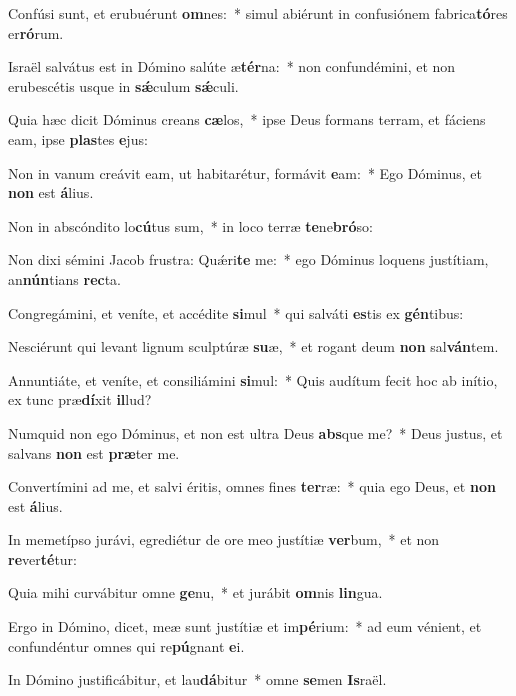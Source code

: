 \item Confúsi sunt, et erubuérunt \textbf{om}nes:~* simul abiérunt in confusiónem fabrica\textbf{tó}res er\textbf{ró}rum.
\item Israël salvátus est in Dómino salúte æ\textbf{tér}na:~* non confundémini, et non erubescétis usque in \textbf{sǽ}culum \textbf{sǽ}culi.
\item Quia hæc dicit Dóminus creans \textbf{cæ}los,~* ipse Deus formans terram, et fáciens eam, ipse \textbf{plas}tes \textbf{e}jus:
\item Non in vanum creávit eam, ut habitarétur, formávit \textbf{e}am:~* Ego Dóminus, et \textbf{non} est \textbf{á}lius.
\item Non in abscóndito lo\textbf{cú}tus sum,~* in loco terræ \textbf{te}ne\textbf{bró}so:
\item Non dixi sémini Jacob frustra: Quǽri\textbf{te} me:~* ego Dóminus loquens justítiam, an\textbf{nún}tians \textbf{rec}ta.
\item Congregámini, et veníte, et accédite \textbf{si}mul~* qui salváti \textbf{es}tis ex \textbf{gén}tibus:
\item Nesciérunt qui levant lignum sculptúræ \textbf{su}æ,~* et rogant deum \textbf{non} sal\textbf{ván}tem.
\item Annuntiáte, et veníte, et consiliámini \textbf{si}mul:~* Quis audítum fecit hoc ab inítio, ex tunc præ\textbf{dí}xit \textbf{il}lud?
\item Numquid non ego Dóminus, et non est ultra Deus \textbf{abs}que me?~* Deus justus, et salvans \textbf{non} est \textbf{præ}ter me.
\item Convertímini ad me, et salvi éritis, omnes fines \textbf{ter}ræ:~* quia ego Deus, et \textbf{non} est \textbf{á}lius.
\item In memetípso jurávi, egrediétur de ore meo justítiæ \textbf{ver}bum,~* et non \textbf{re}ver\textbf{té}tur:
\item Quia mihi curvábitur omne \textbf{ge}nu,~* et jurábit \textbf{om}nis \textbf{lin}gua.
\item Ergo in Dómino, dicet, meæ sunt justítiæ et im\textbf{pé}rium:~* ad eum vénient, et confundéntur omnes qui re\textbf{pú}gnant \textbf{e}i.
\item In Dómino justificábitur, et lau\textbf{dá}bitur~* omne \textbf{se}men \textbf{Is}raël.
